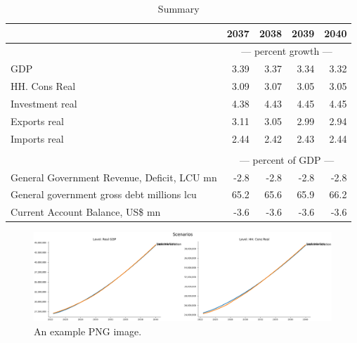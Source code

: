 \documentclass{article}
\begin{document}
 \begin{table}[ht]
\caption{Summary}
\begin{tabular}{lrrrr}
\toprule
 & 2037 & 2038 & 2039 & 2040 \\
\midrule
&\multicolumn{4}{c}{--- percent growth ---}                                                                                 \\
GDP & 3.39 & 3.37 & 3.34 & 3.32 \\
HH. Cons Real & 3.09 & 3.07 & 3.05 & 3.05 \\
Investment real & 4.38 & 4.43 & 4.45 & 4.45 \\
Exports real & 3.11 & 3.05 & 2.99 & 2.94 \\
Imports real & 2.44 & 2.42 & 2.43 & 2.44 \\
&\multicolumn{4}{c}{  }                                                                                 \\
&\multicolumn{4}{c}{--- percent of GDP ---}                                                                                 \\
General Government Revenue, Deficit, LCU mn & -2.8 & -2.8 & -2.8 & -2.8 \\
General government gross debt millions lcu & 65.2 & 65.6 & 65.9 & 66.2 \\
Current Account Balance, US\$ mn & -3.6 & -3.6 & -3.6 & -3.6 \\
\bottomrule
\end{tabular}
\end{table}


\begin{figure}[htbp]
\centering
\includegraphics[width=\textwidth]{onefig.png}
\caption{An example PNG image.}
\label{fig:examplepng}
\end{figure}
\end{document}
